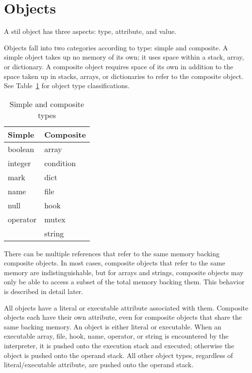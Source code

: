 \section{Objects}

A stil object has three aspects: type, attribute, and value.

Objects fall into two categories according to type: simple and composite.  A
simple object takes up no memory of its own; it uses space within a stack,
array, or dictionary.  A composite object requires space of its own in addition
to the space taken up in stacks, arrays, or dictionaries to refer to the
composite object.  See Table~\ref{simple-composite} for object type
classifications.

\begin{table}[htb]
\begin{center}
\begin{tabular}{|l|l|}
\hline
Simple	& Composite	\\
\hline \hline
boolean	& array		\\
integer	& condition	\\
mark	& dict		\\
name	& file		\\
null	& hook		\\
operator & mutex	\\
	& string	\\
\hline
\end{tabular}
\label{simple-composite}
\end{center}
\caption{Simple and composite types}
\end{table}

There can be multiple references that refer to the same memory backing composite
objects.  In most cases, composite objects that refer to the same memory are
indistinguishable, but for arrays and strings, composite objects may only be
able to access a subset of the total memory backing them.  This behavior is
described in detail later.

All objects have a literal or executable attribute associated with them.
Composite objects each have their own attribute, even for composite objects that
share the same backing memory.  An object is either literal or executable.  When
an executable array, file, hook, name, operator, or string is encountered by the
interpreter, it is pushed onto the execution stack and executed; otherwise the
object is pushed onto the operand stack.  All other object types, regardless of
literal/executable attribute, are pushed onto the operand stack.

